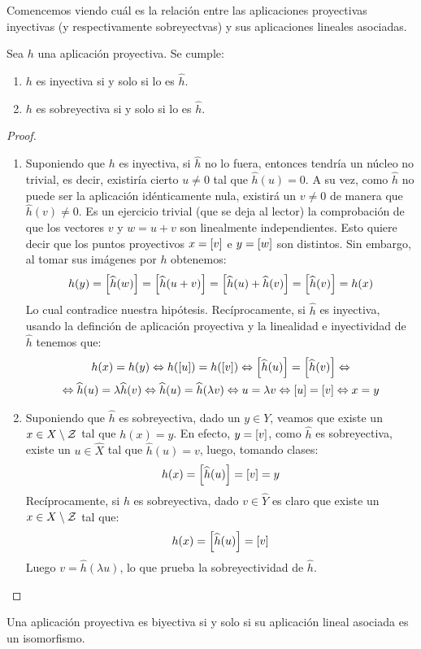 Comencemos viendo cuál es la relación entre las aplicaciones proyectivas inyectivas (y respectivamente sobreyectvas) y sus aplicaciones lineales asociadas.
\begin{lem}
	\label{C4_lem_inyectividadSobreyectividad}
	Sea $h$ una aplicación proyectiva. Se cumple:
	\begin{enumerate}
		\item $h$ es inyectiva si y solo si lo es $\widehat{h}$.
		\item $h$ es sobreyectiva si y solo si lo es $\widehat{h}$.
	\end{enumerate}
\end{lem}
\begin{proof}
	\begin{enumerate}
		\item Suponiendo que $h$ es inyectiva, si $\widehat{h}$ no lo fuera, entonces tendría un núcleo no trivial, es decir, existiría cierto $u\not=0$ tal que $\widehat{h}(u)=0$. A su vez, como $\widehat{h}$ no puede ser la aplicación idénticamente nula, existirá un $v\not=0$ de manera que $\widehat{h}(v)\not=0$. Es un ejercicio trivial (que se deja al lector) la comprobación de que los vectores $v$ y $w=u+v$ son linealmente independientes. Esto quiere decir que los puntos proyectivos $x=\left [ v \right ]$ e $y=\left [ w \right ]$ son distintos. Sin embargo, al tomar sus imágenes por $h$ obtenemos:
		\[h(y)=\left [ \widehat{h}(w) \right ]=\left [ \widehat{h}(u+v) \right ]=\left [ \widehat{h}(u)+\widehat{h}(v) \right ]=\left [ \widehat{h}(v) \right ]=h(x)\]
		Lo cual contradice nuestra hipótesis. Recíprocamente, si $\widehat{h}$ es inyectiva, usando la definción de aplicación proyectiva y la linealidad e inyectividad de $\widehat{h}$ tenemos que:
		\begin{multline}
			h(x)=h(y)\Leftrightarrow h(\left [ u \right ])=h(\left [ v \right ])\Leftrightarrow\left [ \widehat{h}(u) \right ]=\left [ \widehat{h}(v) \right ]\Leftrightarrow\\\Leftrightarrow\widehat{h}(u)=\lambda \widehat{h}(v)\Leftrightarrow\widehat{h}(u)=\widehat{h}(\lambda v)\Leftrightarrow u = \lambda v\Leftrightarrow\left [ u \right ]=\left [ v \right ]\Leftrightarrow x=y
		\end{multline}
		\item Suponiendo que $\widehat{h}$ es sobreyectiva, dado un $y\in Y$, veamos que existe un $x\in X\setminus\mathcal{Z}$ tal que $h(x)=y$. En efecto, $y=\left [ v \right ]$, como $\widehat{h}$ es sobreyectiva, existe un $u\in \widehat{X}$ tal que $\widehat{h}(u)=v$, luego, tomando clases:
		\[h(x)=\left [ \widehat{h}(u) \right ]=\left [ v \right ]=y\]
		Recíprocamente, si $h$ es sobreyectiva, dado $v\in\widehat{Y}$ es claro que existe un $x\in X\setminus\mathcal{Z}$ tal que: 
		\[h(x)=\left [ \widehat{h}(u) \right ]=\left [ v \right ]\]
		Luego $v=\widehat{h}(\lambda u)$, lo que prueba la sobreyectividad de $\widehat{h}$.
	\end{enumerate}
\end{proof}
\begin{cor}[Biyectividad]
	Una aplicación proyectiva es biyectiva si y solo si su aplicación lineal asociada es un isomorfismo.
\end{cor}

